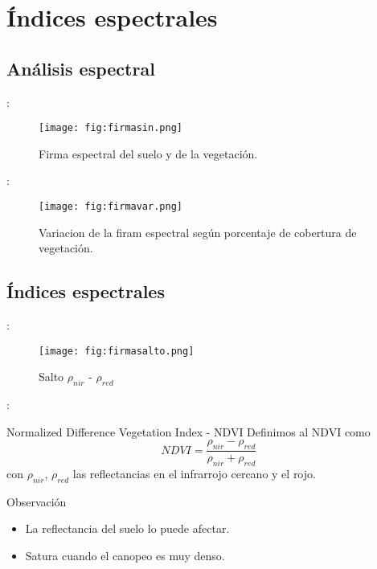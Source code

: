 \section{Índices espectrales}
\subsection{Análisis espectral}

\begin{frame}{\secname : \subsecname}
  \begin{figure}
    \centering
    \texttt{[image: fig:firmasin.png]}
    \caption{Firma espectral del suelo y de la vegetación.}
    \label{}
  \end{figure}
\end{frame}

\begin{frame}{\secname : \subsecname}
  \begin{figure}
    \centering
    \texttt{[image: fig:firmavar.png]}
    \caption{Variacion de la firam espectral según porcentaje de cobertura de vegetación.}
    \label{}
  \end{figure}
\end{frame}

\subsection{Índices espectrales}

\begin{frame}{\secname : \subsecname}
  \begin{figure}
    \centering
    \texttt{[image: fig:firmasalto.png]}
    \caption{Salto $\rho_{nir}$ - $\rho_{red}$}
    \label{}
  \end{figure}
\end{frame}


\begin{frame}{\secname : \subsecname}
\begin{block}{Normalized Difference Vegetation Index - NDVI}
  Definimos al NDVI como
  \begin{equation}
    NDVI = \frac{\rho_{nir}-\rho_{red}}{\rho_{nir}+\rho_{red}}
  \end{equation}
  con $\rho_{nir}$, $\rho_{red}$ las reflectancias en el infrarrojo cercano y el rojo.
\end{block}
\begin{block}{Observación}
    \begin{itemize}[<+->]
        \item La reflectancia del suelo lo puede afectar.
        \item Satura cuando el canopeo es muy denso.
    \end{itemize}
\end{block}
\end{frame}


